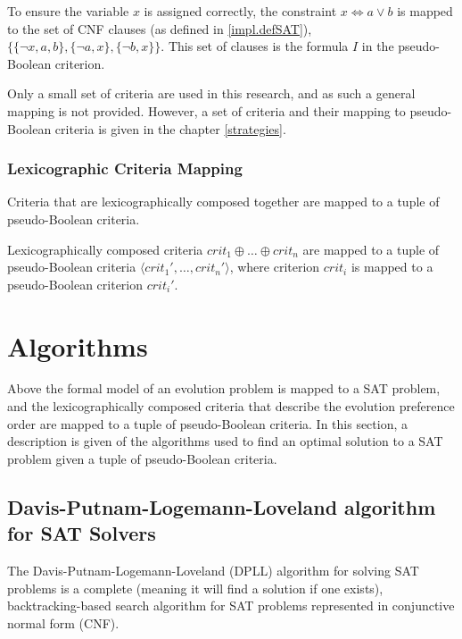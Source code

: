 To ensure the variable $x$ is assigned correctly, the constraint $x \Leftrightarrow a \vee b$ is mapped to the set of CNF clauses (as defined in \ref{impl.defSAT}),
$\{\{\neg x, a,b\}, \{\neg a,x\}, \{\neg b, x \}\}$.
This set of clauses is the formula $I$ in the pseudo-Boolean criterion.

Only a small set of criteria are used in this research, and as such a general mapping is not provided.
However, a set of criteria and their mapping to pseudo-Boolean criteria is given in the chapter \ref{strategies}. 

\subsubsection{Lexicographic Criteria Mapping}
Criteria that are lexicographically composed together are mapped to a tuple of pseudo-Boolean criteria. 
\begin{defs}
Lexicographically composed criteria $crit_1 \oplus \ldots \oplus crit_n$ are mapped to a tuple of pseudo-Boolean criteria $\langle crit_1',\ldots,crit_n'\rangle$,
where criterion $crit_i$ is mapped to a pseudo-Boolean criterion $crit_i'$.
\end{defs}

\section{Algorithms}
\label{impl.algorithms}
Above the formal model of an evolution problem is mapped to a SAT problem, 
and the lexicographically composed criteria that describe the evolution preference order are mapped to a tuple of pseudo-Boolean criteria.
In this section, a description is given of the algorithms used to find an optimal solution to a SAT problem given a tuple of pseudo-Boolean criteria. 

\subsection{Davis-Putnam-Logemann-Loveland algorithm for SAT Solvers}
The Davis-Putnam-Logemann-Loveland (DPLL) algorithm \citep{Davis1960, davis1962machine} for solving SAT problems is a complete (meaning it will find a solution if one exists), 
backtracking-based search algorithm for SAT problems represented in conjunctive normal form (CNF).

